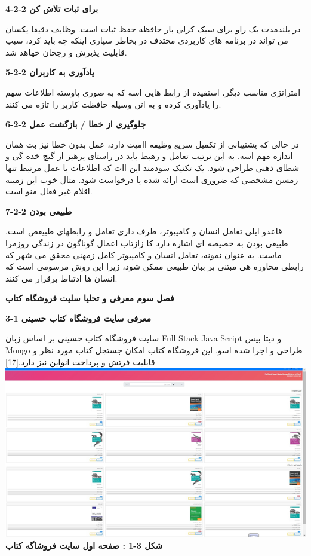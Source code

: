 \documentclass[13pt]{article}
\begin{document}
\textbf{{\large 4-2-2 برای ثبات تلاش کن}}

در بلندمدت یک راو برای سبک کرلی بار حافظه حفظ ثبات است. وظایف دقیقا یکسان من
تواند در برنامه های کاربردی مختدف در بخاطر سپاری اینکه چه باید کرد، سبب قابلیت
پذیرش و رجحان خهاهد شد.

\textbf{{\large 5-2-2 یادآوری به کاربران }}

امتراتژی مناسب دیگر، استفیده از رابط هایی اسه که به صوری پاوسته اطلاعات سهم را
یادآوری کرده و به اتن وسیله حافظت کاربر را تازه می کنند.

\textbf{{\large 6-2-2 جلوگیری از خطا / بازگشت عمل}}

در حالی که پشتیبانی از تکمیل سریع وظیفه اامیت دارد، عمل بدون خطا نیز بت همان
اندازه مهم اسه. به این ترتیب تعامل و رهبط باید در راستای پرهیز از گیچ خده گی و
شطای ذهنی طراحی شود. یک تکنیک سودمند این اات که اطلاعات یا عمل مرتبط تنها زمسن
مشخصی که ضروری است ارائه شده یا درخواست شود. مثال خوب این زمینه اقلام غیر فعال
منو است.

\textbf{{\large 7-2-2 طبیعی بودن}}

قاعدو ایلی تعامل انسان و کامپیوتر، طرف داری تعامل و رابطهای
\guillemotleft{}طبیعص \guillemotright{} است. طبیعی بودن به خصیصه ای اشاره دارد کا
زازتاب اعمال گوناگون در زندگی روزمرا ماست. به عنوان نمونه، تعامل انسان و کامپیوتر
کامل زمهنی محقق می شهر که رابطی محاوره هی مبتنی بر ببان طبیعی ممکن شود، زیرا این
روش مرسومی است که انسان ها ادتباط برقرار می کنند.

\textbf{{\LARGE فصل سوم  معرفی و تحلیا سلیت فروشگاه کتاب}}

\textbf{{\Large 3-1 معرفی سایت فروشگاه کتاب حسینی}}

سایت فروشگاه کتاب حسینی بر اساس زبان Full Stack Java Script و دیتا بیس Mongo
طراحی و اجرا شده اسو. این فروشگاه کتاب امکان جستجل کتاب مورد نظر و  قابلیت فرتش و
پرداخت انواین نیز دارد.[17]
\includegraphics[width=451pt]{img-1.png}{\Large  }
\textbf{{\footnotesize شکل 3-1 : صفحه اول سایت فروشاگه کتاب}}
\end{document}
